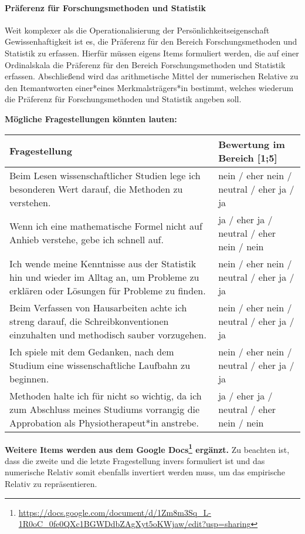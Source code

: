 \documentclass[doc]{apa7}
\begin{document}
\paragraph{Präferenz für Forschungsmethoden und Statistik} Weit komplexer als die Operationalisierung der Persönlichkeitseigenschaft Gewissenhaftigkeit ist es, die Präferenz für den Bereich Forschungsmethoden und Statistik zu erfassen. Hierfür müssen eigens Items formuliert werden, die auf einer Ordinalskala die Präferenz für den Bereich Forschungsmethoden und Statistik erfassen. Abschließend wird das arithmetische Mittel der numerischen Relative zu den Itemantworten einer*eines Merkmalsträgers*in bestimmt, welches wiederum die Präferenz für Forschungsmethoden und Statistik angeben soll.\newline

\noindent \textbf{Mögliche Fragestellungen könnten lauten:}

\begin{table}[!htbp]
  \centering
    \begin{tabularx}{\textwidth}{Xl}
    \toprule
    Fragestellung & Bewertung im Bereich [1;5] \\
    \midrule
    Beim Lesen wissenschaftlicher Studien lege ich besonderen Wert darauf, die Methoden zu verstehen. & nein / eher nein / neutral / eher ja / ja \\
    \hline
    Wenn ich eine mathematische Formel nicht auf Anhieb verstehe, gebe ich schnell auf.  & ja / eher ja / neutral / eher nein / nein \\
    \hline
    Ich wende meine Kenntnisse aus der Statistik hin und wieder im Alltag an, um Probleme zu erklären oder Lösungen für Probleme zu finden. & nein / eher nein / neutral / eher ja / ja \\
    \hline
    Beim Verfassen von Hausarbeiten achte ich streng darauf, die Schreibkonventionen einzuhalten und methodisch sauber vorzugehen. & nein / eher nein / neutral / eher ja / ja \\
    \hline
    Ich spiele mit dem Gedanken, nach dem Studium eine wissenschaftliche Laufbahn zu beginnen. & nein / eher nein / neutral / eher ja / ja \\
    \hline
    Methoden halte ich für nicht so wichtig, da ich zum Abschluss meines Studiums vorrangig die Approbation als Physiotherapeut*in anstrebe.  & ja / eher ja / neutral / eher nein / nein \\
    \bottomrule
    \end{tabularx}%
\end{table}%
\noindent \textbf{Weitere Items werden aus dem Google Docs\footnote{\url{https://docs.google.com/document/d/1Zm8m3Sq_L-1R0oC_0fe0QXc1BGWDdbZAgXyt5oKWjaw/edit?usp=sharing}} ergänzt.}
\noindent Zu beachten ist, dass die zweite und die letzte Fragestellung invers formuliert ist und das numerische Relativ somit ebenfalls invertiert werden muss, um das empirische Relativ zu repräsentieren.

\printbibliography
\end{document}

